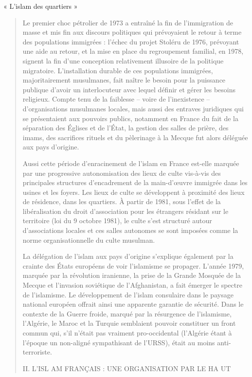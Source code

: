 « L'islam des quartiers »

\begin{quote}
Le premier choc pétrolier de 1973 a entraîné la fin de l'immigration de
masse et mis fin aux discours politiques qui prévoyaient le retour à
terme des populations immigrées : l'échec du projet Stoléru de 1976,
prévoyant une aide au retour, et la mise en place du regroupement
familial, en 1978, signent la fin d'une conception relativement
illusoire de la politique migratoire. L'installation durable de ces
populations immigrées, majoritairement musulmanes, fait naître le besoin
pour la puissance publique d'avoir un interlocuteur avec lequel définir
et gérer les besoins religieux. Compte tenu de la faiblesse -- voire de
l'inexistence -- d'organisations musulmanes locales, mais aussi des
entraves juridiques qui se présentaient aux pouvoirs publics, notamment
en France du fait de la séparation des Églises et de l'État, la gestion
des salles de prière, des imams, des sacrifices rituels et du pèlerinage
à la Mecque fut alors déléguée aux pays d'origine.

Aussi cette période d'enracinement de l'islam en France est-elle marquée
par une progressive autonomisation des lieux de culte vis-à-vis des
principales structures d'encadrement de la main-d'œuvre immigrée dans
les usines et les foyers. Les lieux de culte se développent à proximité
des lieux de résidence, dans les quartiers. À partir de 1981, sous
l'effet de la libéralisation du droit d'association pour les étrangers
résidant sur le territoire (loi du 9 octobre 1981), le culte s'est
structuré autour d'associations locales et ces salles autonomes se sont
imposées comme la norme organisationnelle du culte musulman.

La délégation de l'islam aux pays d'origine s'explique également par la
crainte des États européens de voir l'islamisme se propager. L'année
1979, marquée par la révolution iranienne, la prise de la Grande Mosquée
de la Mecque et l'invasion soviétique de l'Afghanistan, a fait émerger
le spectre de l'islamisme. Le développement de l'islam consulaire dans
le paysage national européen offrait ainsi une apparente garantie de
sécurité. Dans le contexte de la Guerre froide, marqué par la résurgence
de l'islamisme, l'Algérie, le Maroc et la Turquie semblaient pouvoir
constituer un front commun qui, s'il n'était pas vraiment pro-occidental
(l'Algérie étant à l'époque un non-aligné sympathisant de l'URSS), était
au moins anti-terroriste.

II. L'ISL AM FRANÇAIS : UNE ORGANISATION PAR LE HA UT
\end{quote}

